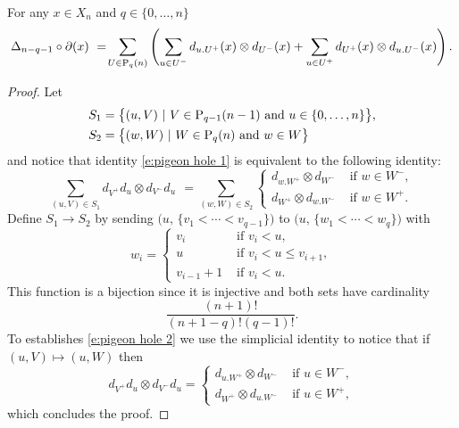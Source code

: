 
\begin{lemma} \label{l:pigeon hole}
	For any $x \in X_n$ and $q \in \{0, \dots, n\}$
	\begin{equation} \label{e:pigeon hole 1}
	\Delta_{n-q-1} \circ \partial (x)\ =\! 
	\sum_{U \in \P_q(n)} \left( 
	\sum_{u \in U^-} d_{u.U^+}(x) \otimes d_{U^-}(x) + 
	\sum_{u \in U^+} d_{U^+}(x) \otimes d_{u.U^-}(x) \right).
	\end{equation}
\end{lemma}

\begin{proof}
	Let
	\begin{align*}
	& S_1 = \big\{ (u, V)\ |\ V \in \P_{q-1}(n-1) \text{ and } u \in \{0,\dots,n\} \big\}, \\
	& S_2 = \big\{ (w, W)\ |\ W \in \P_{q}(n) \text{ and } w \in W \big\}
	\end{align*}
	and notice that identity \eqref{e:pigeon hole 1} is equivalent to the following identity:
	\begin{equation} \label{e:pigeon hole 2}
	\sum_{(u, V) \in S_1} d_{V^+}d_u \otimes d_{V^-}d_u \ \, = \!
	\sum_{(w, W) \in S_2} 
	\begin{cases}
	d_{w.W^+} \otimes d_{W^-} & \text{ if } w \in W^-, \\
	d_{W^+} \otimes d_{w.W^-} & \text{ if } w \in W^+.
	\end{cases}
	\end{equation}	
	Define $S_1 \to S_2$ by sending $\big(u,\, \{v_1 < \cdots < v_{q-1}\} \big)$ to $\big(u,\, \{w_1 < \cdots < w_{q}\} \big)$ with
	\begin{equation*}
	w_i = 
	\begin{cases}
	v_i & \text{ if } v_i < u, \\
	u & \text{ if } v_i < u \leq v_{i+1}, \\
	v_{i-1}+1 & \text{ if } v_i < u.
	\end{cases}
	\end{equation*} 
	This function is a bijection since it is injective and both sets have cardinality 
	\begin{equation*}
	\frac{(n+1)!}{(n+1-q)!(q-1)!}.
	\end{equation*}
	To establishes \eqref{e:pigeon hole 2} we use the simplicial identity to notice that if $(u, V) \mapsto (u, W)$ then
	\begin{equation*}
	d_{V^+}d_u \otimes d_{V^-}d_u =
	\begin{cases}
	d_{u.W^+} \otimes d_{W^-} & \text{ if } u \in W^-, \\
	d_{W^+} \otimes d_{u.W^-} & \text{ if } u \in W^+,
	\end{cases}
	\end{equation*}
	which concludes the proof.
\end{proof}


